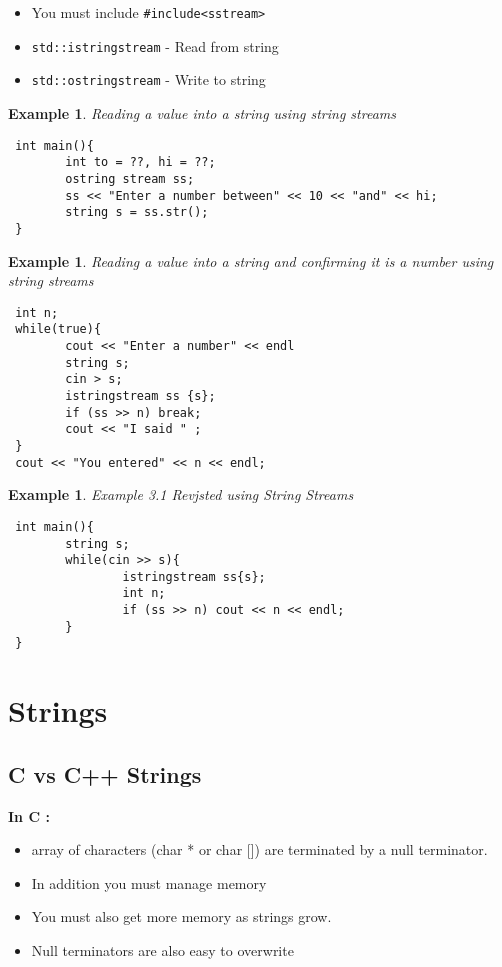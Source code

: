 \documentclass{article}
\newtheorem{ex}[theorem]{Example}
\begin{document}
 \begin{itemize}
 \item You must include \verb|#include<sstream>|
 \item \verb|std::istringstream| - Read from string
 \item \verb|std::ostringstream| - Write to string
 \end{itemize}

\newpage

 \begin{ex} Reading a value into a string using string streams
 \begin{lstlisting}
 int main(){
 		int to = ??, hi = ??;
 		ostring stream ss;
 		ss << "Enter a number between" << 10 << "and" << hi;
 		string s = ss.str();
 }
 \end{lstlisting}
 \end{ex}
 \begin{ex} Reading a value into a string and confirming it is a number using string streams 
 \begin{lstlisting}
 int n;
 while(true){
 		cout << "Enter a number" << endl 
 		string s;
 		cin > s;
 		istringstream ss {s};
 		if (ss >> n) break;
 		cout << "I said " ;
 }
 cout << "You entered" << n << endl;
 \end{lstlisting}
 \end{ex}
 
 \begin{ex} Example 3.1 Revjsted using String Streams
 \begin{lstlisting}
 int main(){
 		string s;
 		while(cin >> s){
 				istringstream ss{s};
 				int n;
 				if (ss >> n) cout << n << endl;
 		}
 }
 \end{lstlisting}
 \end{ex}
 
 \section{Strings}
 \subsection{C vs C++ Strings}
 \textbf{In C : }
 \begin{itemize}
 \item array of characters (char * or char []) are terminated by a null terminator. 
 \item In addition you must manage memory 
 \item You must also get more memory as strings grow. 
 \item Null terminators are also easy to overwrite
 \end{itemize}
 
\end{document}
